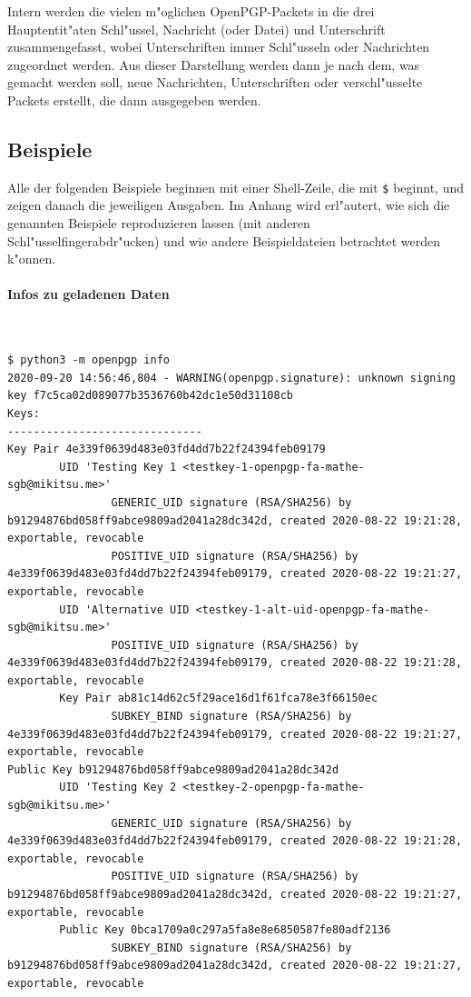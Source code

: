 \documentclass[12pt]{article}
\begin{document}
Intern werden die vielen m"oglichen OpenPGP-Packets in die drei Hauptentit"aten
Schl"ussel, Nachricht (oder Datei) und Unterschrift zusammengefasst,
wobei Unterschriften immer Schl"usseln oder Nachrichten zugeordnet werden.
Aus dieser Darstellung werden dann je nach dem, was gemacht werden soll,
neue Nachrichten, Unterschriften oder verschl"usselte Packets erstellt,
die dann ausgegeben werden.

\subsection{Beispiele}
Alle der folgenden Beispiele beginnen mit einer Shell-Zeile, die mit \verb|$| beginnt,
und zeigen danach die jeweiligen Ausgaben.
Im Anhang wird erl"autert, wie sich die genannten Beispiele reproduzieren lassen
(mit anderen Schl"usselfingerabdr"ucken) und wie andere Beispieldateien betrachtet werden k"onnen.

\lstset{
breaklines,
basicstyle=\scriptsize\ttfamily,
language=none,
}

\paragraph{Infos zu geladenen Daten}~
\begin{lstlisting}
$ python3 -m openpgp info
2020-09-20 14:56:46,804 - WARNING(openpgp.signature): unknown signing key f7c5ca02d089077b3536760b42dc1e50d31108cb
Keys:
------------------------------
Key Pair 4e339f0639d483e03fd4dd7b22f24394feb09179
        UID 'Testing Key 1 <testkey-1-openpgp-fa-mathe-sgb@mikitsu.me>'
                GENERIC_UID signature (RSA/SHA256) by b91294876bd058ff9abce9809ad2041a28dc342d, created 2020-08-22 19:21:28, exportable, revocable
                POSITIVE_UID signature (RSA/SHA256) by 4e339f0639d483e03fd4dd7b22f24394feb09179, created 2020-08-22 19:21:27, exportable, revocable
        UID 'Alternative UID <testkey-1-alt-uid-openpgp-fa-mathe-sgb@mikitsu.me>'
                POSITIVE_UID signature (RSA/SHA256) by 4e339f0639d483e03fd4dd7b22f24394feb09179, created 2020-08-22 19:21:28, exportable, revocable
        Key Pair ab81c14d62c5f29ace16d1f61fca78e3f66150ec
                SUBKEY_BIND signature (RSA/SHA256) by 4e339f0639d483e03fd4dd7b22f24394feb09179, created 2020-08-22 19:21:27, exportable, revocable
Public Key b91294876bd058ff9abce9809ad2041a28dc342d
        UID 'Testing Key 2 <testkey-2-openpgp-fa-mathe-sgb@mikitsu.me>'
                GENERIC_UID signature (RSA/SHA256) by 4e339f0639d483e03fd4dd7b22f24394feb09179, created 2020-08-22 19:21:28, exportable, revocable
                POSITIVE_UID signature (RSA/SHA256) by b91294876bd058ff9abce9809ad2041a28dc342d, created 2020-08-22 19:21:27, exportable, revocable
        Public Key 0bca1709a0c297a5fa8e8e6850587fe80adf2136
                SUBKEY_BIND signature (RSA/SHA256) by b91294876bd058ff9abce9809ad2041a28dc342d, created 2020-08-22 19:21:27, exportable, revocable
\end{lstlisting}
\end{document}
